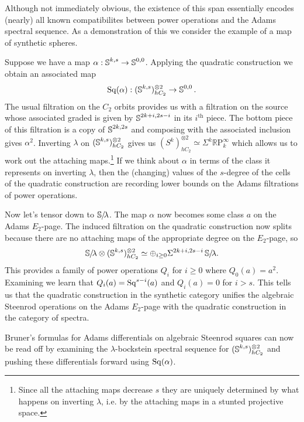 Although not immediately obvious, the existence of this span essentially encodes (nearly) all known compatibilites between power operations and the Adams spectral sequence. As a demonstration of this we consider the example of a map of synthetic spheres.

\begin{exm} \label{exm:quadratic-basics}
  Suppose we have a map $\alpha : \operatorname{\mathbb{S}}^{k,s} \to \operatorname{\mathbb{S}}^{0,0}$.
  Applying the quadratic construction we obtain an associated map
  \[ \operatorname{\mathrm{Sq}}(\alpha) : (\operatorname{\mathbb{S}}^{k,s})^{\otimes 2}_{hC_2} \to \operatorname{\mathbb{S}}^{0,0}. \]
  The usual filtration on the $C_2$ orbits provides us with a filtration on the source whose associated graded is given by $\operatorname{\mathbb{S}}^{2k+i,2s-i}$ in its $i^{\text{th}}$ piece. The bottom piece of this filtration is a copy of $\operatorname{\mathbb{S}}^{2k,2s}$ and composing with the associated inclusion gives $\alpha^2$. Inverting $\lambda$ on $(\operatorname{\mathbb{S}}^{k,s})^{\otimes 2}_{hC_2}$ gives us $(S^{k})^{\otimes 2}_{hC_2} \simeq \Sigma^k \mathbb{R}\mathrm{P}^\infty_k$ which allows us to work out the attaching maps.\footnote{Since all the attaching maps decrease $s$ they are uniquely determined by what happens on inverting $\lambda$, i.e. by the attaching maps in a stunted projective space.} If we think about $\alpha$ in terms of the class it represents on inverting $\lambda$, then the (changing) values of the $s$-degree of the cells of the quadratic construction are recording lower bounds on the Adams filtrations of power operations.

  Now let's tensor down to $\operatorname{\mathbb{S}}\hspace{-2.2pt}/\!\lambda$.
  The map $\alpha$ now becomes some class $a$ on the Adams $E_2$-page.
  The induced filtration on the quadratic construction now splits because there are no attaching maps of the appropriate degree on the $E_2$-page, so
  \[ \operatorname{\mathbb{S}}\hspace{-2.2pt}/\!\lambda \otimes (\operatorname{\mathbb{S}}^{k,s})^{\otimes 2}_{hC_2} \simeq \oplus_{i \geq 0} \Sigma^{2k+i,2s-i} \operatorname{\mathbb{S}}\hspace{-2.2pt}/\!\lambda.  \]
  This provides a family of power operations $Q_i$ for $i \geq 0$ where $Q_0(a) = a^2$.
  Examining \cite{May-power-ops} we learn that $Q_i(a) = \operatorname{\mathrm{Sq}}^{s-i}(a)$ and $Q_i(a) = 0$ for $i > s$. This tells us that the quadratic construction in the synthetic category unifies the algebraic Steenrod operations on the Adams $E_2$-page with the quadratic construction in the category of spectra.

  Bruner's formulas for Adams differentials on algebraic Steenrod squares can now be read off by examining the $\lambda$-bockstein spectral sequence for $(\operatorname{\mathbb{S}}^{k,s})^{\otimes 2}_{hC_2}$ and pushing these differentials forward using $\operatorname{\mathrm{Sq}}(\alpha)$.
\end{exm}

